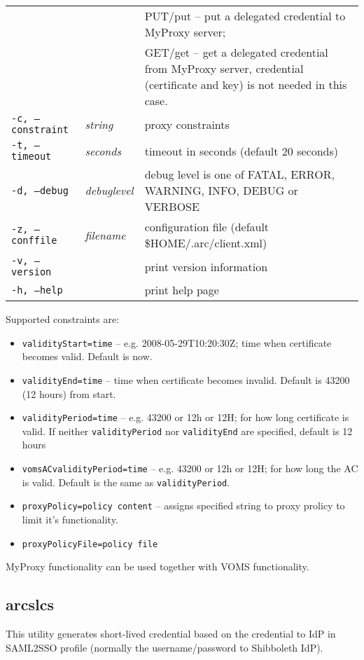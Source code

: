 \begin{longtable}{llp{8cm}}
   & &PUT/put -- put a delegated credential to MyProxy server;\\
   & &GET/get -- get a delegated credential from MyProxy server, credential (certificate and key) is not needed in this case.\\
   \texttt{-c, --constraint}& \textit{string} & proxy constraints\\
   \texttt{-t, --timeout}& \textit{seconds} & timeout in seconds (default 20 seconds)\\
   \texttt{-d, --debug}& \textit{debuglevel}&debug level is one of  FATAL, ERROR, WARNING, INFO, DEBUG or VERBOSE\\
   \texttt{-z, --conffile}&\textit{filename}& configuration file (default {\$}HOME/.arc/client.xml)\\
   \texttt{-v, --version}& & print version information\\
   \texttt{-h, --help}& & print help page\\
\end{longtable}

Supported constraints are:
\begin{itemize}
  \item \texttt{validityStart=time} -- e.g. 2008-05-29T10:20:30Z; time when certificate becomes valid. Default is now.
  \item \texttt{validityEnd=time} -- time when certificate becomes invalid. Default is 43200 (12 hours) from start.
  \item \texttt{validityPeriod=time} -- e.g. 43200 or 12h or 12H; for how long certificate is valid. If neither \texttt{validityPeriod} nor \texttt{validityEnd} are specified, default is 12 hours
  \item \texttt{vomsACvalidityPeriod=time} -- e.g. 43200 or 12h or 12H; for how long the AC is valid. Default is the same as \texttt{validityPeriod}.
  \item \texttt{proxyPolicy=policy content} -- assigns specified string to proxy prolicy to limit it's functionality.
  \item \texttt{proxyPolicyFile=policy file}
\end{itemize}

MyProxy functionality can be used together with VOMS functionality.


\subsection{arcslcs}
\label{sec:arcslcs}

This utility generates  short-lived
credential  based  on the credential to IdP in SAML2SSO profile (normally the
username/password to Shibboleth IdP).

